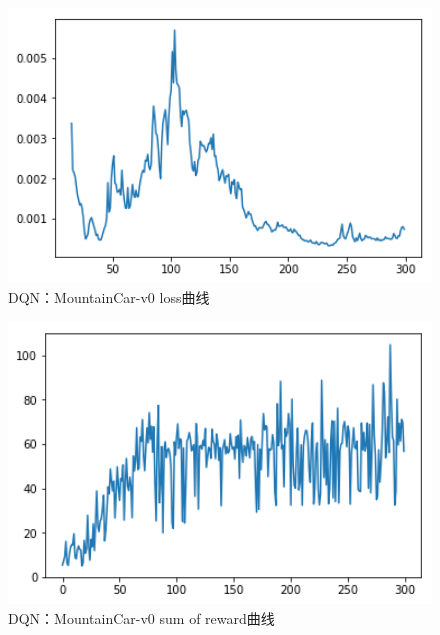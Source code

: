 \documentclass[a4paper,UTF8]{article}
\theoremstyle{definition}
\begin{document}
    \begin{center}
    \begin{figure}[H]
          \centering
          \includegraphics[width=12cm]{7.png}
          \caption{DQN：MountainCar-v0 loss曲线}
          \label{fig:2.3}
    \end{figure}
    \end{center}
    \begin{center}
    \begin{figure}[H]
          \centering
          \includegraphics[width=12cm]{8.png}
          \caption{DQN：MountainCar-v0 sum of reward曲线}
          \label{fig:2.3}
    \end{figure}
    \end{center}
\end{document}
